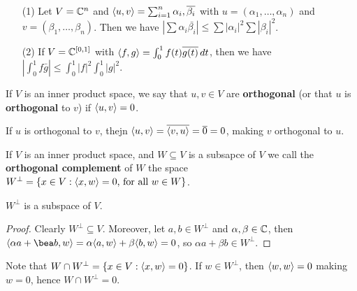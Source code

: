 \begin{example}
    \begin{enumerate}
        \item[(1)] Let $V=\mathbb{C}^n$ and  $\langle u,v\rangle=\sum_{i=1}^n{\alpha_i,\overline{\beta_i}}$ with
            $u=(\alpha_1, \dots, \alpha_n)$ and $v=(\beta_1, \dots, \beta_n)$. Then we have
            $|\sum{\alpha_i\bar{\beta_i}}| \leq \sum{|\alpha_i|^2}\sum{|\beta_i|^2}$.		

        \item[(2)] If $V=\mathbb{C}^{[0,1]}$ with $\langle f,g\rangle=\int_{0}^1{f(t)\overline{g(t)}} \dd{t}$, then we
            have $|\int_{0}^1{f\bar{g}}| \leq \int_{0}^1{|f|^2}\int_{0}^1{|g|^2}$.
    \end{enumerate}
\end{example} 

\begin{definition}
    If $V$ is an inner product space, we say that $u, v \in V$ are \textbf{orthogonal} (or that $u$
    is  \textbf{orthogonal} to $v$) if $\langle u,v\rangle=0$.
\end{definition}

\begin{example}
    If $u$ is orthogonal to  $v$, thejn  $\langle u,v\rangle=\overline{\langle v,u\rangle}=\overline{0}=0$, making $v$
    orthogonal to $u$.
\end{example} 

\begin{definition}
    If $V$ is an inner product space, and  $W \subseteq V$ is a subsapce of  $V$ we call the
    \textbf{orthogonal complement} of $W$ the space  $W^\perp=\{x \in V: \langle x,w\rangle=0 \text{, for
    all } w \in W\}$.
\end{definition}

\begin{lemma}\label{1.4.4}
    $W^\perp$ is a subspace of  $V$.
\end{lemma}
\begin{proof}
    Clearly $W^\perp \subseteq V$. Moreover, let $a,b \in W^\perp$ and  $\alpha,\beta \in \mathbb{C}$, then
     $\vbrack{\alpha a+\bea b, w}=\alpha\vbrack{a,w}+\beta\vbrack{b,w}=0$, so $\alpha a+\beta b \in
     W^\perp$.
\end{proof}

\begin{example}
    Note that $W \cap W^\perp=\{x \in V: \langle x,w\rangle=0\}$. If $w \in W^\perp$, then $\langle w,w\rangle=0$
    making $w=0$, hence  $W \cap W^\perp=0$.
\end{example} 

